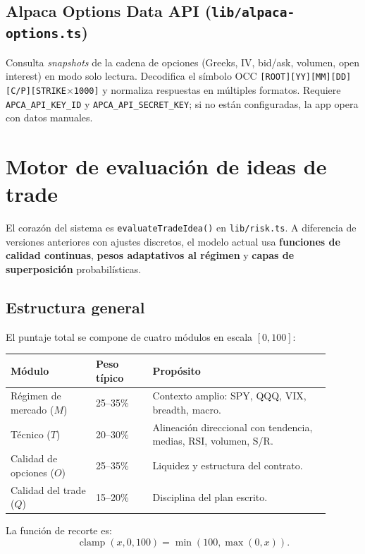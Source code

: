 \documentclass[11pt,letterpaper]{article}
\newcommand{\clp}{\operatorname{clamp}}
\begin{document}
\subsection{Alpaca Options Data API (\texttt{lib/alpaca-options.ts})}
Consulta \emph{snapshots} de la cadena de opciones (Greeks, IV, bid/ask, volumen,
open interest) en modo solo lectura. Decodifica el símbolo OCC
\texttt{[ROOT][YY][MM][DD][C/P][STRIKE$\times$1000]} y normaliza respuestas en
múltiples formatos. Requiere \texttt{APCA\_API\_KEY\_ID} y
\texttt{APCA\_API\_SECRET\_KEY}; si no están configuradas, la app opera con datos
manuales.

\section{Motor de evaluación de ideas de trade}

El corazón del sistema es \texttt{evaluateTradeIdea()} en \texttt{lib/risk.ts}.
A diferencia de versiones anteriores con ajustes discretos, el modelo actual usa
\textbf{funciones de calidad continuas}, \textbf{pesos adaptativos al régimen} y
\textbf{capas de superposición} probabilísticas.

\subsection{Estructura general}

El puntaje total se compone de cuatro módulos en escala $[0,100]$:

\begin{longtable}{p{0.24\linewidth} p{0.16\linewidth} p{0.50\linewidth}}
\toprule
\textbf{Módulo} & \textbf{Peso típico} & \textbf{Propósito} \\
\midrule
Régimen de mercado ($M$) & 25--35\% & Contexto amplio: SPY, QQQ, VIX, breadth, macro. \\
Técnico ($T$) & 20--30\% & Alineación direccional con tendencia, medias, RSI, volumen, S/R. \\
Calidad de opciones ($O$) & 25--35\% & Liquidez y estructura del contrato. \\
Calidad del trade ($Q$) & 15--20\% & Disciplina del plan escrito. \\
\bottomrule
\end{longtable}

La función de recorte es:
\begin{equation}
\clp(x,0,100) = \min(100,\max(0,x)).
\end{equation}
\end{document}
